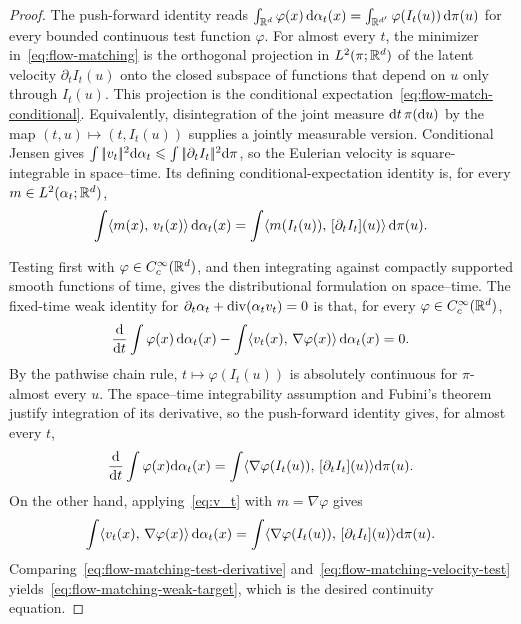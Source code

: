 \begin{proof}
The push-forward identity reads \(\int_{\mathbb{R}^d}\varphi(x)\,\mathrm{d}\alpha_t(x)=\int_{\mathbb{R}^{d'}}\varphi(I_t(u))\,\mathrm{d}\pi(u)\) for every bounded continuous test function $\varphi$.
For almost every $t$, the minimizer in~\eqref{eq:flow-matching} is the orthogonal projection in $L^2(\pi;\mathbb{R}^d)$ of the latent velocity $\partial_t I_t(u)$ onto the closed subspace of functions that depend on $u$ only through $I_t(u)$. This projection is the conditional expectation~\eqref{eq:flow-match-conditional}. Equivalently, disintegration of the joint measure \(\mathrm{d} t\,\pi(\mathrm{d} u)\) by the map \((t,u)\mapsto(t,I_t(u))\) supplies a jointly measurable version. Conditional Jensen gives \(\int|\!| v_t |\!|^2\mathrm{d}\alpha_t\leqslant\int|\!| \partial_t I_t |\!|^2\mathrm{d}\pi\),
so the Eulerian velocity is square-integrable in space--time. Its defining conditional-expectation identity is, for every \(m\in L^2(\alpha_t;\mathbb{R}^d)\),
\begin{equation}\label{eq:v_t}
\int \langle m(x),\,v_t(x)\rangle \, \mathrm{d}\alpha_t(x)
=
\int \langle m(I_t(u)),\,[\partial_t I_t](u)\rangle \, \mathrm{d}\pi(u).
\end{equation}

Testing first with \(\varphi\in C_c^\infty(\mathbb{R}^d)\), and then integrating against compactly supported smooth functions of time, gives the distributional formulation on space--time. The fixed-time weak identity for
$\partial_t\alpha_t+\operatorname{div}(\alpha_t v_t)=0$ is that, for every $\varphi\in C_c^\infty(\mathbb{R}^d)$,
\begin{equation}\label{eq:flow-matching-weak-target}
\frac{\mathrm{d}}{\mathrm{d} t}\int\varphi(x)\,\mathrm{d}\alpha_t(x)
-
\int\langle v_t(x),\,\nabla\varphi(x)\rangle\,\mathrm{d}\alpha_t(x)
=0.
\end{equation}
By the pathwise chain rule, $t\mapsto\varphi(I_t(u))$ is absolutely continuous for $\pi$-almost every $u$. The space--time integrability assumption and Fubini's theorem justify integration of its derivative, so the push-forward identity gives, for almost every $t$,
\begin{equation}\label{eq:flow-matching-test-derivative}
\frac{\mathrm{d}}{\mathrm{d} t}\int \varphi(x)\mathrm{d}\alpha_t(x)
=
\int \langle \nabla\varphi(I_t(u)),\,[\partial_t I_t](u)\rangle\mathrm{d}\pi(u).
\end{equation}
On the other hand, applying~\eqref{eq:v_t} with $m=\nabla\varphi$ gives
\begin{equation}\label{eq:flow-matching-velocity-test}
\int\langle v_t(x),\,\nabla\varphi(x)\rangle\,\mathrm{d}\alpha_t(x)
=
\int \langle \nabla\varphi(I_t(u)),\,[\partial_t I_t](u)\rangle\mathrm{d}\pi(u).
\end{equation}
Comparing~\eqref{eq:flow-matching-test-derivative} and~\eqref{eq:flow-matching-velocity-test} yields~\eqref{eq:flow-matching-weak-target}, which is the desired continuity equation.
\end{proof}
